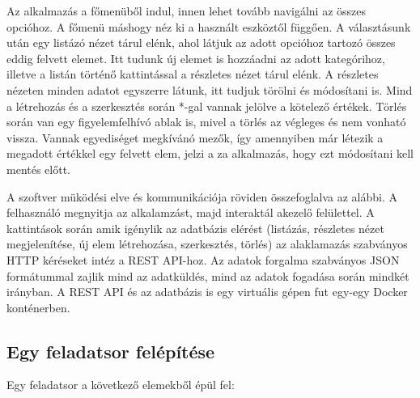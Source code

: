 Az alkalmazás a főmenüből indul, innen lehet tovább navigálni az összes opcióhoz.
A főmenü máshogy néz ki a használt eszköztől függően.
A választásunk után egy listázó nézet tárul elénk, ahol látjuk az adott opcióhoz tartozó összes eddig felvett elemet.
Itt tudunk új elemet is hozzáadni az adott kategórihoz, illetve a listán történő kattintással a részletes nézet tárul elénk.
A részletes nézeten minden adatot egyszerre látunk, itt tudjuk törölni és módosítani is.
Mind a létrehozás és a szerkesztés során *-gal vannak jelölve a kötelező értékek. Törlés során van egy figyelemfelhívó ablak is, mivel a törlés az végleges és nem vonható vissza.
Vannak egyediséget megkívánó mezők, így amennyiben már létezik a megadott értékkel egy felvett elem, jelzi a za alkalmazás, hogy ezt módosítani kell mentés előtt.

A szoftver müködési elve és kommunikációja röviden összefoglalva az alábbi.
A felhasználó megnyitja az alkalamzást, majd interaktál akezelő felülettel.
A kattintások során amik igénylik az adatbázis elérést (listázás, részletes nézet megjelenítése, új elem létrehozása, szerkesztés, törlés) az alaklamazás szabványos HTTP kéréseket intéz a REST API-hoz.
Az adatok forgalma szabványos JSON formátummal zajlik mind az adatküldés, mind az adatok fogadása során mindkét irányban.
A REST API és az adatbázis is egy virtuális gépen fut egy-egy Docker konténerben.


\subsection{Egy feladatsor felépítése}

Egy feladatsor a következő elemekből épül fel:

